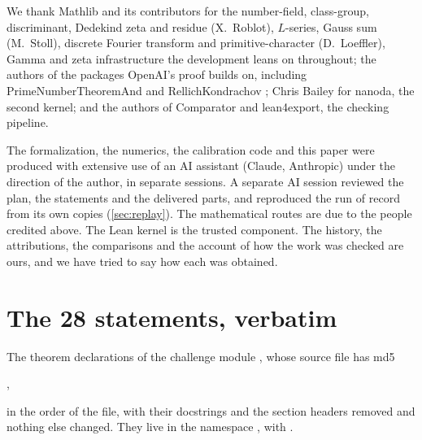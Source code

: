 \documentclass[11pt]{article}
\theoremstyle{definition}
\begin{document}
We thank Mathlib and its contributors for the number-field, class-group, discriminant, Dedekind zeta and residue (X.~Roblot), $L$-series, Gauss sum (M.~Stoll), discrete Fourier transform and primitive-character (D.~Loeffler), Gamma and zeta infrastructure the development leans on throughout; the authors of the packages OpenAI's proof builds on, including PrimeNumberTheoremAnd \cite{PNT} and RellichKondrachov \cite{RK}; Chris Bailey for nanoda, the second kernel; and the authors of Comparator and lean4export, the checking pipeline.

The formalization, the numerics, the calibration code and this paper were produced with extensive use of an AI assistant (Claude, Anthropic) under the direction of the author, in separate sessions. A separate AI session reviewed the plan, the statements and the delivered parts, and reproduced the run of record from its own copies (\cref{sec:replay}). The mathematical routes are due to the people credited above. The Lean kernel is the trusted component. The history, the attributions, the comparisons and the account of how the work was checked are ours, and we have tried to say how each was obtained.




\appendix
\section{The 28 statements, verbatim}\label{app:statements}

The theorem declarations of the challenge module , whose source file has md5
\begin{center},\end{center}
in the order of the file, with their docstrings and the section headers removed and nothing else changed. They live in the namespace , with .


\end{document}
